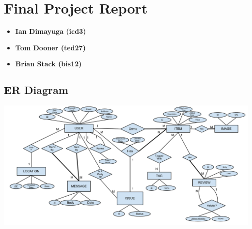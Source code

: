 \documentclass[12pt]{article}
\begin{document}
\section*{Final Project Report}
\begin{itemize}
    \item \textbf{Ian Dimayuga (icd3)}
    \item \textbf{Tom Dooner (ted27)}
    \item \textbf{Brian Stack (bis12)}
\end{itemize}
\subsection*{ER Diagram}
\includegraphics[scale=0.5]{EECS341ProjectERDiagram.pdf}
\end{document}
